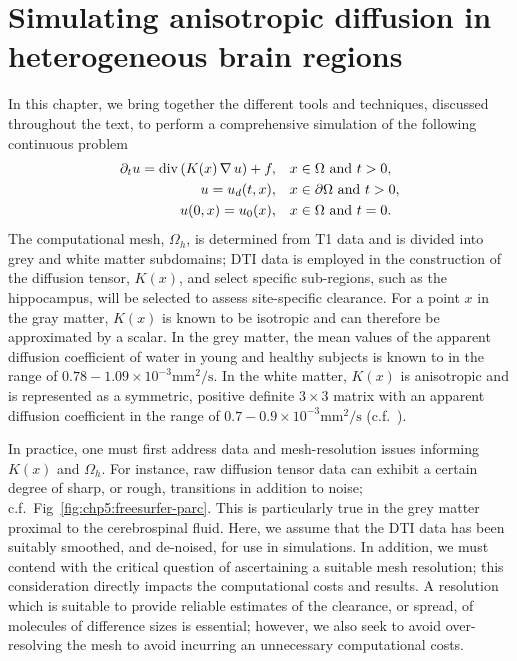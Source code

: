 \chapter{Simulating anisotropic diffusion in heterogeneous brain regions}
\label{chp:chp6}


In this chapter, we bring together the different tools and techniques, discussed 
throughout the text, to perform a comprehensive simulation of the following 
continuous problem
\begin{align}\label{eqn:chp6:model-problem}
	\partial_t u = \operatorname{\mathrm{div}}\left(K(x) \operatorname{\nabla} u\right) + f,& \quad x\in\Omega \text{ and } t>0,\\
	u=u_d(t,x),&\quad x\in\partial\Omega \text{ and } t>0, \\ 
        u(0,x) =  u_0(x),&\quad x\in \Omega \text{ and } t=0.
\end{align}
The computational mesh, $\Omega_h$, is determined from T1 data and is  
divided into grey and white matter subdomains; DTI data is employed in the 
construction of the diffusion tensor, $K(x)$, and select specific  
sub-regions, such as the hippocampus, will be selected to assess site-specific 
clearance.  For a point $x$ in the gray matter, $K(x)$ is known to be isotropic and can 
therefore be approximated by a scalar.  In the grey matter, the mean values of 
the apparent diffusion coefficient of water in young and healthy subjects is known 
to in the range of $0.78-1.09 \times 10^{-3} \mbox{mm}^2 /\mbox{s}$.  In the white 
matter, $K(x)$ is anisotropic and is represented as a symmetric, positive definite 
$3\times 3$ matrix with an apparent diffusion coefficient in the range of 
$0.7-0.9 \times 10^{-3}\mbox{mm}^2/\mbox{s}$ (c.f.~\cite{helenius2002diffusion}). 

In practice, one must first address data and mesh-resolution issues 
informing $K(x)$ and $\Omega_h$.  For instance, raw diffusion tensor data can exhibit 
a certain degree of sharp, or rough, transitions in addition to noise; 
c.f.~Fig~\ref{fig:chp5:freesurfer-parc}.  This is particularly true in the grey 
matter proximal to the cerebrospinal fluid.  Here, we assume that the DTI data 
has been suitably smoothed, and de-noised, for use in simulations.  In addition, 
we must contend with the critical question of ascertaining a suitable mesh resolution; 
this consideration directly impacts the computational costs and results.
A resolution which is suitable to provide reliable estimates of the clearance, 
or spread, of molecules of difference sizes is essential; however, we also seek 
to avoid over-resolving the mesh to avoid incurring an unnecessary computational 
costs.  

